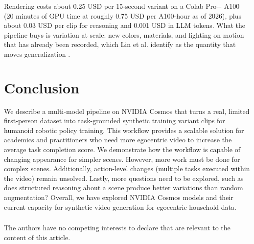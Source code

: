 \documentclass[runningheads]{llncs}
\begin{document}
Rendering costs about 0.25 USD per 15-second variant on a Colab Pro+ A100 (20 minutes of GPU time at roughly 0.75 USD per A100-hour as of 2026), plus about 0.03 USD per clip for reasoning and 0.001 USD in LLM tokens. What the pipeline buys is variation at scale: new colors, materials, and lighting on motion that has already been recorded, which Lin et al. identify as the quantity that moves generalization \cite{r4}.

\section{Conclusion}

We describe a multi-model pipeline on NVIDIA Cosmos that turns a real, limited first-person dataset into task-grounded synthetic training variant clips for humanoid robotic policy training. This workflow provides a scalable solution for academics and practitioners who need more egocentric video to increase the average task completion score. We demonstrate how the workflow is capable of changing appearance for simpler scenes. However, more work must be done for complex scenes. Additionally, action-level changes (multiple tasks executed within the video) remain unsolved. Lastly, more questions need to be explored, such as does structured reasoning about a scene produce better variations than random augmentation? Overall, we have explored NVIDIA Cosmos models and their current capacity for synthetic video generation for egocentric household data.

\begin{credits}
\subsubsection{\discintname}
The authors have no competing interests to declare that are relevant to the content of this article.
\end{credits}
\end{document}
